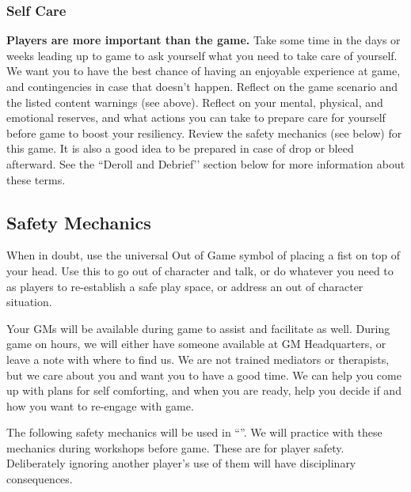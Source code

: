 \documentclass[sheet]{GL2020}
\begin{document}
\subsubsection{Self Care}
\textbf{Players are more important than the game.} Take some time in the days or weeks leading up to game to ask yourself what you need to take care of yourself. We want you to have the best chance of having an enjoyable experience at game, and contingencies in case that doesn't happen. Reflect on the game scenario and the listed content warnings (see above). Reflect on your mental, physical, and emotional reserves, and what actions you can take to prepare care for yourself before game to boost your resiliency. Review the safety mechanics (see below) for this game. It is also a good idea to be prepared in case of drop or bleed afterward. See the ``Deroll and Debrief'’ section below for more information about these terms.

\subsection{Safety Mechanics}
When in doubt, use the universal Out of Game symbol of placing a fist on top of your head. Use this to go out of character and talk, or do whatever you need to as players to re-establish a safe play space, or address an out of character situation. 

Your GMs will be available during game to assist and facilitate as well. During game on hours, we will either have someone available at GM Headquarters, or leave a note with where to find us. We are not trained mediators or therapists, but we care about you and want you to have a good time. We can help you come up with plans for self comforting, and when you are ready, help you decide if and how you want to re-engage with game.

The following safety mechanics will be used in ``\gamename{}''. We will practice with these mechanics during workshops before game. These are for player safety. Deliberately ignoring another player's use of them will have disciplinary consequences.
\end{document}
